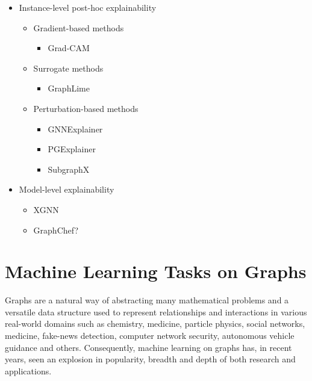 \begin{itemize}
\begin{itemize}
			\item Instance-level post-hoc explainability
				\begin{itemize}
					\item Gradient-based methods
						\begin{itemize}
							\item Grad-CAM
						\end{itemize}
					\item Surrogate methods
						\begin{itemize}
							\item GraphLime
						\end{itemize}
					\item Perturbation-based methods
						\begin{itemize}
							\item GNNExplainer
							\item PGExplainer
							\item SubgraphX
						\end{itemize}
				\end{itemize}
			\item Model-level explainability
				\begin{itemize}
					\item XGNN
					\item GraphChef?
				\end{itemize}
		\end{itemize}
\end{itemize}


\section{Machine Learning Tasks on Graphs}

Graphs are a natural way of abstracting many mathematical problems and a versatile data structure used to represent relationships and interactions in various real-world domains such as chemistry, medicine, particle physics, social networks, medicine, fake-news detection, computer network security, autonomous vehicle guidance and others. Consequently, machine learning on graphs has, in recent years, seen an explosion in popularity, breadth and depth of both research and applications.

